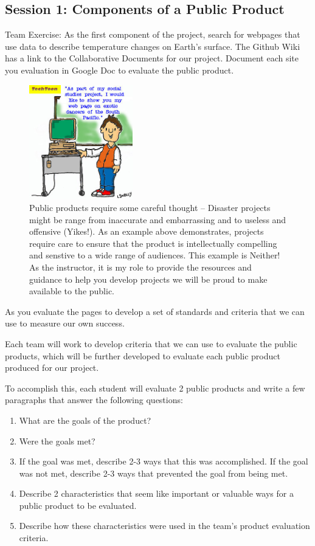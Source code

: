 \documentclass{article}\usepackage[]{graphicx}\usepackage[]{color}
\begin{document}
\subsection{Session 1: Components of a Public Product}

Team Exercise: As the first component of the project, search for webpages that use data to describe temperature changes on Earth's surface. The Github Wiki has a link to the Collaborative Documents for our project. Document each site you evaluation in Google Doc to evaluate the public product.

\begin{figure}
  \centering
	\includegraphics[width=0.40\textwidth]{figure/PublicProductDisasters.jpg}
	\caption{Public products require some careful thought -- Disaster projects might be range from  inaccurate and embarrassing and to useless and offensive (Yikes!). As an example above demonstrates, projects require care to ensure that the product is intellectually compelling and senstive to a wide range of audiences. This example is Neither! As the instructor, it is my role to provide the resources and guidance to help you develop projects we will be proud to make available to the public.}
	\label{fig:PublicProductDisasters}
\end{figure}

As you evaluate the pages to develop a set of standards and criteria that we can use to measure our own success.

Each team will work to develop criteria that we can use to evaluate the public products, which will be further developed to evaluate each public product produced for our project.

To accomplish this, each student will evaluate 2 public products and write a few paragraphs that answer the following questions:

\begin{enumerate}
  \item What are the goals of the product?
  \item Were the goals met?
  \item If the goal was met, describe 2-3 ways that this was accomplished. If the goal was not met, describe 2-3 ways that prevented the goal from being met.
  \item Describe 2 characteristics that seem like important or valuable ways for a public product to be evaluated.
  \item Describe how these characteristics were used in the team's product evaluation criteria. 
\end{enumerate}
\end{document}
